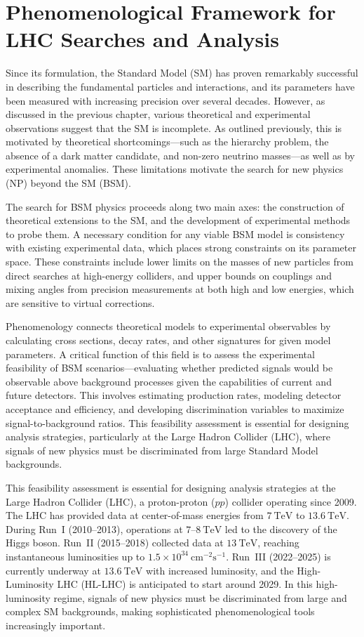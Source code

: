 \chapter[Phenomenological Framework]{Phenomenological Framework for LHC Searches and Analysis}

Since its formulation, the Standard Model (SM) has proven remarkably successful in describing the fundamental particles and interactions, and its parameters have been measured with increasing precision over several decades. However, as discussed in the previous chapter, various theoretical and experimental observations suggest that the SM is incomplete. As outlined previously, this is motivated by theoretical shortcomings—such as the hierarchy problem, the absence of a dark matter candidate, and non-zero neutrino masses—as well as by experimental anomalies. These limitations motivate the search for new physics (NP) beyond the SM (BSM).

The search for BSM physics proceeds along two main axes: the construction of theoretical extensions to the SM, and the development of experimental methods to probe them. A necessary condition for any viable BSM model is consistency with existing experimental data, which places strong constraints on its parameter space. These constraints include lower limits on the masses of new particles from direct searches at high-energy colliders, and upper bounds on couplings and mixing angles from precision measurements at both high and low energies, which are sensitive to virtual corrections.

Phenomenology connects theoretical models to experimental observables by calculating cross sections, decay rates, and other signatures for given model parameters. A critical function of this field is to assess the experimental feasibility of BSM scenarios—evaluating whether predicted signals would be observable above background processes given the capabilities of current and future detectors. This involves estimating production rates, modeling detector acceptance and efficiency, and developing discrimination variables to maximize signal-to-background ratios. This feasibility assessment is essential for designing analysis strategies, particularly at the Large Hadron Collider (LHC), where signals of new physics must be discriminated from large Standard Model backgrounds.

This feasibility assessment is essential for designing analysis strategies at the Large Hadron Collider (LHC), a proton-proton ($pp$) collider operating since 2009. The LHC has provided data at center-of-mass energies from $7~\mathrm{TeV}$ to $13.6~\mathrm{TeV}$. During Run~I (2010–2013), operations at $7$–$8~\mathrm{TeV}$ led to the discovery of the Higgs boson. Run~II (2015–2018) collected data at $13~\mathrm{TeV}$, reaching instantaneous luminosities up to $1.5 \times 10^{34}~\mathrm{cm}^{-2}\mathrm{s}^{-1}$. Run~III (2022–2025) is currently underway at $13.6~\mathrm{TeV}$ with increased luminosity, and the High-Luminosity LHC (HL-LHC) is anticipated to start around 2029. In this high-luminosity regime, signals of new physics must be discriminated from large and complex SM backgrounds, making sophisticated phenomenological tools increasingly important.

 
 
 
 
